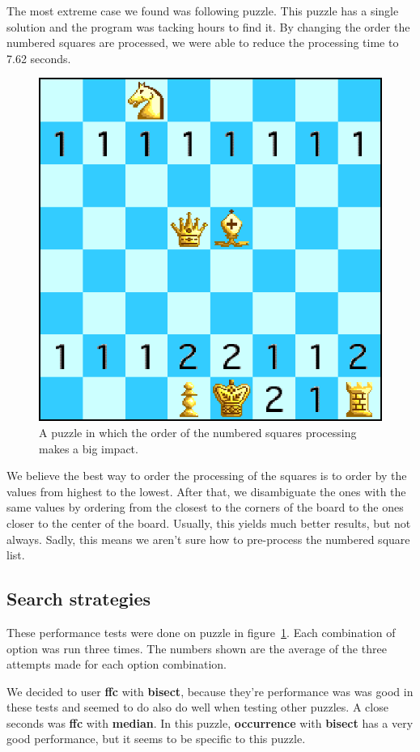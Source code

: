 \documentclass[runningheads]{llncs}
\begin{document}
The most extreme case we found was following puzzle. This puzzle has a single
solution and the program was tacking hours to find it. By changing the order
the numbered squares are processed, we were able to reduce the processing time
to 7.62 seconds.

\begin{figure}[H]
  \centering
  \includegraphics[width=0.4\linewidth]{figures/chess7.eps}
  \caption{A puzzle in which the order of the numbered squares processing makes a big impact.}\label{fig:fig6}
\end{figure}

We believe the best way to order the processing of the squares is to order by
the values from highest to the lowest. After that, we disambiguate the ones
with the same values by ordering from the closest to the corners of the board
to the ones closer to the center of the board. Usually, this yields much better
results, but not always. Sadly, this means we aren't sure how to pre-process
the numbered square list.

\subsection{Search strategies}

These performance tests were done on puzzle in figure~\ref{fig:fig6}. Each combination
of option was run three times. The numbers shown are the average of the three
attempts made for each option combination.

We decided to user \textbf{ffc} with \textbf{bisect}, because they're performance
was was good in these tests and seemed to do also do well when testing other
puzzles. A close seconds was \textbf{ffc} with \textbf{median}. In this puzzle,
\textbf{occurrence} with \textbf{bisect} has a very good performance, but it
seems to be specific to this puzzle.
\end{document}
